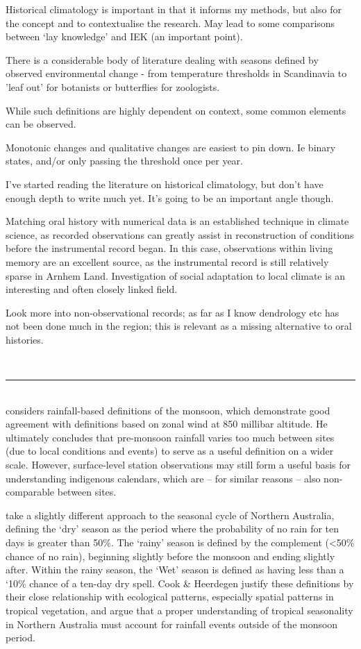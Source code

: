 Historical climatology is important in that it informs my methods,
but also for the concept and to contextualise the research.  May lead to
some comparisons between `lay knowledge' and IEK (an important point).


There is a considerable body of literature dealing with seasons defined
by observed environmental change - from temperature thresholds in
Scandinavia to 'leaf out' for botanists or butterflies for zoologists.

While such definitions are highly dependent on context, some common
elements can be observed.

Monotonic changes and qualitative changes are easiest to pin down.
Ie binary states, and/or only passing the threshold once per year.


I've started reading the literature on historical climatology, but don't have
enough depth to write much yet.  It's going to be an important angle though.

Matching oral history with numerical data is an established technique in
climate science, as recorded observations can greatly assist in reconstruction
of conditions before the instrumental record began.  In this case, observations
within living memory are an excellent source, as the instrumental record is
still relatively sparse in Arnhem Land.  Investigation of social adaptation to
local climate is an interesting and often closely linked field.

Look more into non-observational records; as far as I know dendrology etc has
not been done much in the region; this is relevant as a missing alternative to
oral histories.


~\\ \hrule ~\\


\citet{holland1985} considers rainfall-based definitions of the
monsoon, which demonstrate good agreement with definitions based on zonal
wind at 850 millibar altitude.  He ultimately concludes that pre-monsoon
rainfall varies too much between sites (due to local conditions and events)
to serve as a useful definition on a wider scale.
%
However, surface-level station observations may still form a useful basis for
understanding indigenous calendars, which are -- for similar reasons -- also
non-comparable between sites.

\citet{cook2001} take a slightly different approach to the seasonal cycle of
Northern Australia, defining the `dry' season as the period where the probability
of no rain for ten days is greater than 50\%.  The `rainy' season is defined by
the complement (\textless50\% chance of no rain), beginning slightly before the
monsoon and ending slightly after.  Within the rainy season, the `Wet' season
is defined as having less than a `10\% chance of a ten-day dry spell.
%
Cook \& Heerdegen justify these definitions by their close relationship with
ecological patterns, especially spatial patterns in tropical vegetation,
and argue that a proper understanding of tropical seasonality in Northern
Australia must account for rainfall events outside of the monsoon period.



